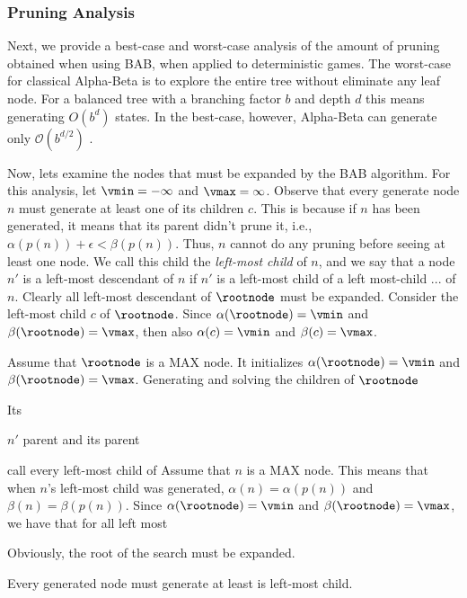 
\subsubsection{Pruning Analysis}



Next, we provide a best-case and worst-case analysis of the amount of pruning obtained when using BAB, when applied to deterministic games. 
The worst-case for classical Alpha-Beta is to explore the entire tree without eliminate any leaf node. For a balanced tree with a branching factor $b$ and depth $d$ this means generating $O(b^d)$ states. In the best-case, however, Alpha-Beta can generate only $\mathcal{O}(b^{d/2})$ \cite{knuth1975analysis}. 


Now, lets examine the nodes that must be expanded by the BAB algorithm. 
For this analysis, let $\vmin=-\infty$ and $\vmax=\infty$. 
Observe that every generate node $n$ must generate at least one of its children $c$. This is because if $n$ has been generated, it means that its parent didn't prune it, i.e., $\alpha(p(n))+\epsilon<\beta(p(n))$. 
Thus, $n$ cannot do any pruning before seeing at least one node. 
We call this child the \emph{left-most child} of $n$,
and we say that a node $n'$ is a left-most descendant of $n$
if $n'$ is a left-most child of a left most-child ... of $n$. 
Clearly all left-most descendant of $\rootnode$ must be expanded. 
Consider the left-most child $c$ of $\rootnode$. 
Since $\alpha(\rootnode)=\vmin$ and $\beta(\rootnode)=\vmax$, 
then also $\alpha(c)=\vmin$ and $\beta(c)=\vmax$. 

Assume that $\rootnode$ is a MAX node. 
It initializes $\alpha(\rootnode)=\vmin$ and $\beta(\rootnode)=\vmax$. 
Generating and solving the children of $\rootnode$


Its 

$n'$ parent and its parent

call every left-most child of 
Assume that $n$ is a MAX node. 
This means that when $n$'s left-most child was generated, 
$\alpha(n)=\alpha(p(n))$ and $\beta(n)=\beta(p(n))$. 
Since $\alpha(\rootnode)=\vmin$ and $\beta(\rootnode)=\vmax$, 
we have that for all left most 

Obviously, the root of the search must be expanded. 

Every generated node must generate at least is left-most child. 


